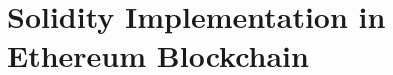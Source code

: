 \documentclass[../main.tex]{subfiles}
\begin{document}
\section{Solidity Implementation in Ethereum Blockchain}
\label{sec:solidity_implementation}
\subsection{}
\end{document}
